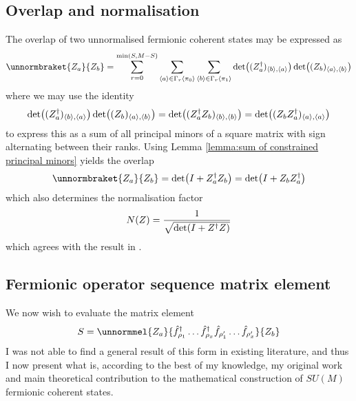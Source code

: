 \subsection{Overlap and normalisation}
The overlap of two unnormalised fermionic coherent states may be expressed as
\begin{equation}
\unnormbraket{Z_a}{Z_b}=\sum_{r=0}^{\min(S,M-S)}\sum_{\seq{a}\in\Gamma_r\seq{\pi_0}}\sum_{\seq{b}\in\Gamma_r\seq{\pi_1}}\det((Z_a\hc)_{\seq{b},\seq{a}})\det((Z_b)_{\seq{a},\seq{b}})
\end{equation}
where we may use the identity
\begin{equation}
\det((Z_a^\dagger)_{\langle b\rangle,\langle a\rangle})\det((Z_b)_{\langle a\rangle,\langle b\rangle})=\det((Z_a^\dagger Z_b)_{\langle b\rangle,\langle b\rangle})=\det((Z_bZ_a^\dagger)_{\langle a\rangle,\langle a\rangle})
\end{equation}
to express this as a sum of all principal minors of a square matrix with sign alternating between their ranks. Using Lemma \ref{lemma:sum of constrained principal minors} yields the overlap
\begin{equation}
\unnormbraket{Z_a}{Z_b}=\det(I+Z_a\hc Z_b)=\det(I+Z_b Z_a\hc)
\end{equation}
which also determines the normalisation factor
\begin{equation}
N(Z)=\frac{1}{\sqrt{\det(I+Z^\dagger Z)}}
\end{equation}
which agrees with the result in \cite[Eq. 2.31]{sampling_algorithm}.

\subsection{Fermionic operator sequence matrix element}
We now wish to evaluate the matrix element
\begin{equation}
S=\unnormmel{Z_a}{\hat{f}\hc_{\rho_1}\dots\hat{f}\hc_{\rho_x}\hat{f}_{\rho'_1}\dots\hat{f}_{\rho'_x}}{Z_b}
\end{equation}
I was not able to find a general result of this form in existing literature, and thus I now present what is, according to the best of my knowledge, my original work and main theoretical contribution to the mathematical construction of $SU(M)$ fermionic coherent states.


